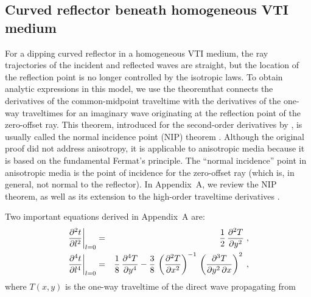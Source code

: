 

\subsection{Curved reflector beneath homogeneous VTI medium} 
For a dipping curved reflector in a homogeneous VTI medium,
the ray trajectories of the incident and reflected waves are straight,
but the location of the reflection point is no longer controlled by
the isotropic laws. To obtain analytic expressions in this
model, we use the theoremthat connects the derivatives of the
common-midpoint traveltime with the derivatives of the one-way
traveltimes for an imaginary wave originating at the reflection point
of the zero-offset ray. This theorem, introduced for the
second-order derivatives by \cite{chergr},
is usually called the normal incidence point (NIP) theorem
\cite[]{hubkrey,GEO48-08-10511062}. Although the original proof did not
address anisotropy, it is applicable to anisotropic media because it is based
on the fundamental Fermat's principle. The ``normal incidence'' point
in anisotropic media is the point of incidence for the zero-offset ray
(which is, in general, not normal to the reflector). In Appendix~A, we
review the NIP theorem, as well as its extension to the high-order
traveltime derivatives \cite[]{fomel}.
\par
Two important equations derived in Appendix~A are:
\begin{eqnarray}
\left.{{\partial^2 t} \over {\partial l^2}}\right|_{l=0} & = &
\frac{1}{2}\,{{\partial^2 T} \over {\partial y^2}}\;,
\label{eqn:NIP2} \\
\left.{{\partial^4 t} \over {\partial l^4}}\right|_{l=0} & = &
\frac{1}{8}\,{{\partial^4 T} \over {\partial y^4}}-
\frac{3}{8}\,\left({{\partial^2 T} \over {\partial x^2}}\right)^{-1}\,
\left({{\partial^3 T} \over {\partial y^2\,\partial x}}\right)^2\;,
\label{eqn:NIP4} 
\end{eqnarray}
where $T(x,y)$ is the one-way traveltime of the direct wave propagating from
